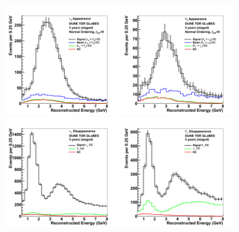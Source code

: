 \documentclass[aps,prd,superscriptaddress]{revtex4-1}
\begin{document}
\begin{figure}[!htpb]
  \centering
  \includegraphics[width=0.45\textwidth]{spec_app_nu_5yr.png}
  \includegraphics[width=0.45\textwidth]{spec_app_anu_5yr.png}
  \includegraphics[width=0.45\textwidth]{spec_dis_nu_5yr.png}
  \includegraphics[width=0.45\textwidth]{spec_dis_anu_5yr.png}

\end{figure}
\end{document}
